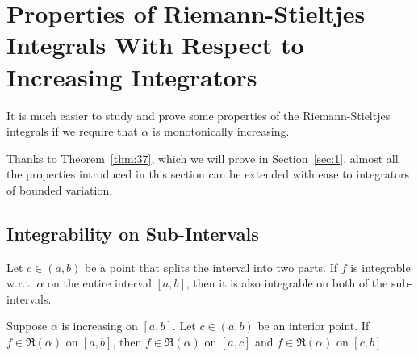 \documentclass[thmcnt=section, 12pt]{my-elegantbook}
\begin{document}

\section{Properties of Riemann-Stieltjes Integrals With Respect to Increasing Integrators}

It is much easier to study and prove some properties of the Riemann-Stieltjes integrals if we require that $\alpha$ is monotonically increasing. 

Thanks to Theorem~\ref{thm:37}, which we will prove in Section~\ref{sec:1}, almost all the properties introduced in this section can be extended with ease to integrators of bounded variation.


\subsection{Integrability on Sub-Intervals}

Let $c \in (a, b)$ be a point that splits the interval into two parts. If $f$ is integrable w.r.t. $\alpha$ on the entire interval $[a, b]$, then it is also integrable on both of the sub-intervals.

\begin{lemma} \label{lem:3}
    Suppose $\alpha$ is increasing on $[a, b]$. Let $c \in (a, b)$ be an interior point. If $f \in \mathfrak{R}(\alpha)$ on $[a, b]$, then $f \in \mathfrak{R}(\alpha)$ on $[a, c]$ and $f \in \mathfrak{R}(\alpha)$ on $[c, b]$
\end{lemma}
\end{document}

